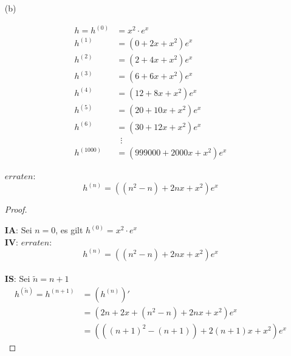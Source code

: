 \begin{enumerate}
\newpage

\item[(b)]

\begin{align*}
h=h^{(0)}&=x^2\cdot e^x\\
h^{(1)}&=(0+2x+x^2)e^x\\
h^{(2)}&=(2+4x+x^2)e^x\\
h^{(3)}&=(6+6x+x^2)e^x\\
h^{(4)}&=(12+8x+x^2)e^x\\
h^{(5)}&=(20+10x+x^2)e^x\\
h^{(6)}&=(30+12x+x^2)e^x\\
&\hspace{6pt}\vdots\\
h^{(1000)}&=(999000+2000x+x^2)e^x
\end{align*}

$erraten$:
\begin{equation*}
h^{(n)}=((n^2-n)+2nx+x^2)e^x
\end{equation*}

\begin{proof}
$ $\newline

$\mathbf{IA}$: Sei $n=0$, es gilt $h^{(0)}=x^2\cdot e^x$\\

$\mathbf{IV}$:
$erraten$:
\begin{equation*}
h^{(n)}=((n^2-n)+2nx+x^2)e^x
\end{equation*}\\

$\mathbf{IS}$: Sei $\tilde{n}=n+1$
\begin{align}
h^{(\tilde{n})}=h^{(n+1)}&=(h^{(n)})'\\
&=(2n+2x+(n^2-n)+2nx+x^2)e^x\\
&=(((n+1)^2-(n+1))+2(n+1)x+x^2)e^x
\end{align}
\end{proof}

\end{enumerate}